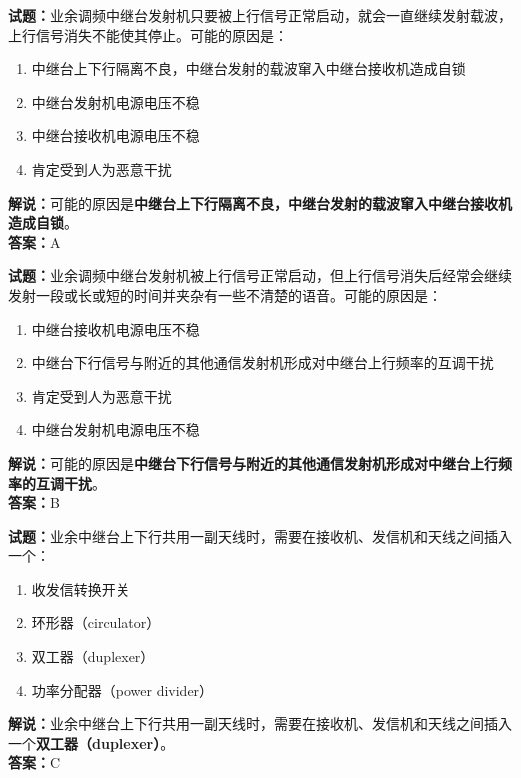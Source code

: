 \documentclass{ctexbook}
\begin{document}
\bigskip


\noindent\textbf{试题：}业余调频中继台发射机只要被上行信号正常启动，就会一直继续发射载波，上行信号消失不能使其停止。可能的原因是：
\begin{enumerate}[leftmargin=3em]
\item 中继台上下行隔离不良，中继台发射的载波窜入中继台接收机造成自锁
\item 中继台发射机电源电压不稳
\item 中继台接收机电源电压不稳
\item 肯定受到人为恶意干扰
\end{enumerate}
\noindent\textbf{解说：}可能的原因是\textbf{中继台上下行隔离不良，中继台发射的载波窜入中继台接收机造成自锁}。\\\noindent\textbf{答案：}A



\bigskip


\noindent\textbf{试题：}业余调频中继台发射机被上行信号正常启动，但上行信号消失后经常会继续发射一段或长或短的时间并夹杂有一些不清楚的语音。可能的原因是：
\begin{enumerate}[leftmargin=3em]
\item 中继台接收机电源电压不稳
\item 中继台下行信号与附近的其他通信发射机形成对中继台上行频率的互调干扰
\item 肯定受到人为恶意干扰
\item 中继台发射机电源电压不稳
\end{enumerate}
\noindent\textbf{解说：}可能的原因是\textbf{中继台下行信号与附近的其他通信发射机形成对中继台上行频率的互调干扰}。\\\noindent\textbf{答案：}B




\bigskip


\noindent\textbf{试题：}业余中继台上下行共用一副天线时，需要在接收机、发信机和天线之间插入一个：
\begin{enumerate}[leftmargin=3em]
\item 收发信转换开关
\item 环形器（circulator）
\item 双工器（duplexer）
\item 功率分配器（power divider）
\end{enumerate}
\noindent\textbf{解说：}业余中继台上下行共用一副天线时，需要在接收机、发信机和天线之间插入一个\textbf{双工器（duplexer）}。\\\noindent\textbf{答案：}C
\end{document}
